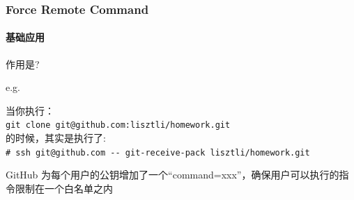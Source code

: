 \begin{frame}[fragile]
  \frametitle{Force Remote Command}
  \framesubtitle{基础应用}

  作用是? \\
  \vspace{\baselineskip}
  \pause

  e.g.

  当你执行： \\
  \vspace{\baselineskip}
  \verb|git clone git@github.com:lisztli/homework.git|  \\
  \vspace{\baselineskip}
  的时候，其实是执行了: \\

  \vspace{\baselineskip}
  \verb|# ssh git@github.com -- git-receive-pack lisztli/homework.git|\\
  \pause

  \vspace{\baselineskip}
  GitHub 为每个用户的公钥增加了一个``command=xxx''，确保用户可以执行的指令限制在一个白名单之内
\end{frame}



